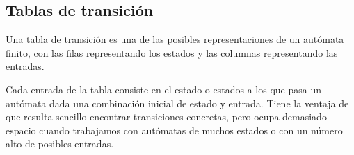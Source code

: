 \subsection{Tablas de transición}
Una tabla de transición es una de las posibles representaciones de un autómata finito, con las filas representando los estados y las columnas representando las entradas.

Cada entrada de la tabla consiste en el estado o estados a los que pasa un autómata dada una combinación inicial de estado y entrada.
Tiene la ventaja de que resulta sencillo encontrar transiciones concretas, pero ocupa demasiado espacio cuando trabajamos con autómatas de muchos estados o con un número alto de posibles entradas.
